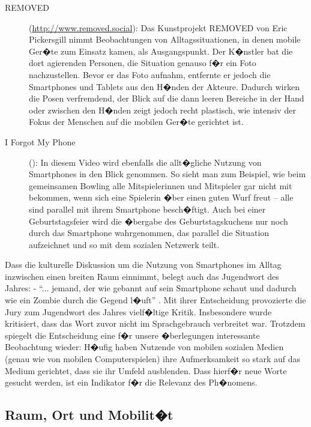 \begin{description}
\item[REMOVED] (\url{http://www.removed.social}): Das Kunstprojekt REMOVED von Eric Pickersgill nimmt Beobachtungen von Alltagssituationen, in denen mobile Ger�te zum Einsatz kamen, als Ausgangspunkt. Der K�nstler bat die dort agierenden Personen, die Situation genauso f�r ein Foto nachzustellen. Bevor er das Foto aufnahm, entfernte er jedoch die Smartphones und Tablets aus den H�nden der Akteure. Dadurch wirken die Posen verfremdend, der Blick auf die dann leeren Bereiche in der Hand oder zwischen den H�nden zeigt jedoch recht plastisch, wie intensiv der Fokus der Menschen auf die mobilen Ger�te gerichtet ist.

\item[I Forgot My Phone] (): In diesem Video wird ebenfalls die allt�gliche Nutzung von Smartphones in den Blick genommen. So sieht man zum Beispiel, wie beim gemeinsamen Bowling alle Mitspielerinnen und Mitspieler gar nicht mit bekommen, wenn sich eine Spielerin �ber einen guten Wurf freut -- alle sind parallel mit ihrem Smartphone besch�ftigt. Auch bei einer Geburtstagsfeier wird die �bergabe des Geburtstagskuchens nur noch durch das Smartphone wahrgenommen, das parallel die Situation aufzeichnet und so mit dem sozialen Netzwerk teilt.
\end{description}

Dass die kulturelle Diskussion um die Nutzung von Smartphones im Alltag inzwischen einen breiten Raum einnimmt, belegt auch das Jugendwort des Jahres:  - ``... jemand, der wie gebannt auf sein Smartphone schaut und dadurch wie ein Zombie durch die Gegend l�uft'' \cite{smombie}. Mit ihrer Entscheidung provozierte die Jury zum Jugendwort des Jahres vielf�ltige Kritik. Insbesondere wurde kritisiert, dass das Wort zuvor nicht im Sprachgebrauch verbreitet war. Trotzdem spiegelt die Entscheidung eine f�r unsere �berlegungen interessante Beobachtung wieder: H�ufig haben Nutzende von mobilen sozialen Medien (genau wie von mobilen Computerspielen) ihre Aufmerksamkeit so stark auf das Medium gerichtet, dass sie ihr Umfeld ausblenden. Dass hierf�r neue Worte gesucht werden, ist ein Indikator f�r die Relevanz des Ph�nomens. 


\subsection{Raum, Ort und Mobilit�t}

